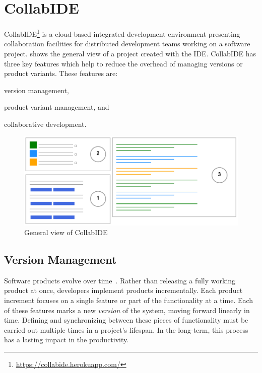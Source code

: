 
\section{CollabIDE}
\label{sec:collab-ide}

CollabIDE\footnote{\url{https://collabide.herokuapp.com/}} is a cloud-based integrated development environment presenting collaboration facilities 
for distributed development teams working on a software project.  shows the 
general view of a project created with the IDE. 
CollabIDE has three key features which help to reduce the overhead of managing versions or product variants. These features are:
\begin{enumerate*}[label=(\arabic*)] 
\item version management, 
\item product variant management, and 
\item collaborative development.
\end{enumerate*}

\begin{figure}[tbp]
  \centering
  \includegraphics[width=1\textwidth]{img/collabIDEGeneral}
  \caption{General view of CollabIDE}
  \label{fig:general-view}
\end{figure}

\subsection{Version Management}
\label{sec:vcs}
Software products evolve over time~\cite{lehman02}. Rather than releasing a fully working product at 
once, developers implement products incrementally. Each product increment focuses on a single 
feature or part of the functionality at a time. Each of these features marks a new \emph{version} of the 
system, moving forward linearly in time. Defining and synchronizing between these pieces of 
functionality must be carried out multiple times in a project's lifespan. In the long-term, this process 
has a lasting impact in the productivity.

